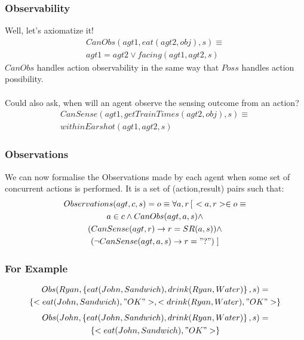 \documentclass{beamer}
\begin{document}
\begin{frame}
\frametitle{Observability}
Well, let's axiomatize it!
\begin{multline*}
  CanObs(agt1,eat(agt2,obj),s) \equiv \\
     agt1=agt2 \vee facing(agt1,agt2,s)
\end{multline*}
$CanObs$ handles action observability in the same way that $Poss$ handles
action possibility.
\ \\
\ \\
\pause
Could also ask, when will an agent observe the sensing outcome from an
action?
\begin{multline*}
  CanSense(agt1,getTrainTimes(agt2,obj),s) \equiv \\ withinEarshot(agt1,agt2,s)
\end{multline*}
\end{frame}

\begin{frame}
\frametitle{Observations}
We can now formalise the Observations made by each agent when some set of
concurrent actions is performed.  It is a set of (action,result) pairs such
that:
\begin{multline*}
Observations(agt,c,s) = o \equiv \forall a,r \left[\right. <a,r> \in o \equiv \\
  a \in c \wedge CanObs(agt,a,s) \wedge \\
  (CanSense(agt,r) \rightarrow r = SR(a,s)) \wedge \\
  (\neg CanSense(agt,a,s) \rightarrow r = "?") \left.\right]\\
\end{multline*}

\end{frame}

\begin{frame}
\frametitle{For Example}
\begin{multline*}
  Obs(Ryan,\left\{eat(John,Sandwich),drink(Ryan,Water)\right\},s) = \\
     \left\{<eat(John,Sandwich),"OK">,<drink(Ryan,Water),"OK">\right\}
\end{multline*}
\pause
\begin{multline*}
  Obs(John,\left\{eat(John,Sandwich),drink(Ryan,Water)\right\},s) = \\
     \left\{<eat(John,Sandwich),"OK">\right\}
\end{multline*}
\end{frame}
\end{document}
